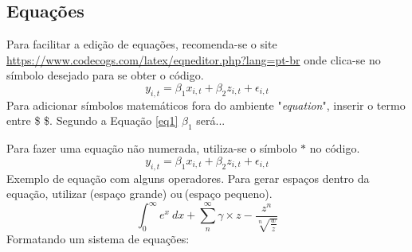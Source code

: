 \documentclass[a4paper]{article} %
\begin{document}
\subsection{Equações} \label{SS12}
Para facilitar a edição de equações, recomenda-se o site \url{https://www.codecogs.com/latex/eqneditor.php?lang=pt-br} onde clica-se no símbolo desejado para se obter o código.
\begin{equation} %
	\label{eq1}
	y_{i,t} = \beta_{1} x_{i,t} + \beta_{2} z_{i,t} + \epsilon_{i,t}
\end{equation}
Para adicionar símbolos matemáticos fora do ambiente "\textit{equation}", inserir o termo entre \$ \$. Segundo a Equação \ref{eq1} $\beta_{1}$ será...  \par 
Para fazer uma equação não numerada, utiliza-se o símbolo $*$ no código.
\begin{equation*}
	y_{i,t} = \beta_{1} x_{i,t} + \beta_{2} z_{i,t} + \epsilon_{i,t}
\end{equation*}
Exemplo de equação com alguns operadores. Para gerar espaços dentro da equação, utilizar$\;$(espaço grande) ou$\:$(espaço pequeno).
\begin{equation} \label{eq2}
\int_{0}^{\infty} e^{x}\: dx + \sum_{n}^{\infty} \gamma \times z - \frac{z^{n}}{\sqrt[n]{\frac{w}{z}}}
\end{equation}
Formatando um sistema de equações:
\end{document}
